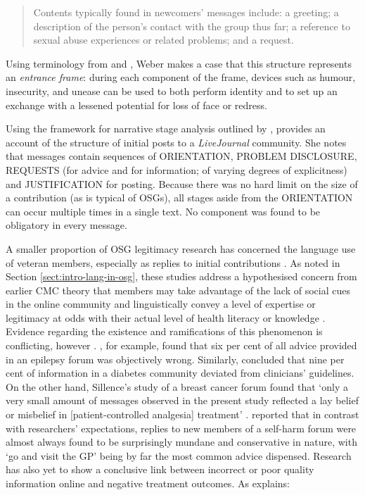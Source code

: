 \documentclass{article}
\renewcommand{\cite}{\parencite}
\begin{document}
\begin{quote}\small\singlespacing
Contents typically found in newcomers' messages include: a greeting; a description of the person's contact with the group thus far; a reference to sexual abuse experiences or related problems; and a request.
\end{quote}
%
Using terminology from \textcite{goffman_presentation_1959} and \textcite{brown_politeness:_1987}, Weber makes a case that this structure represents an \emph{entrance frame}: during each component of the frame, devices such as humour, insecurity, and unease can be used to both perform identity and to set up an exchange with a lessened potential for loss of face or redress. 

Using the framework for narrative stage analysis outlined by \textcite{labov_narrative_1997}, \textcite{kouper_pragmatics_2010} provides an account of the structure of initial posts to a \emph{LiveJournal} community. She notes that messages contain sequences of \textsc{ORIENTATION}, \textsc{PROBLEM DISCLOSURE}, \textsc{REQUESTS} (for advice and for information; of varying degrees of explicitness) and \textsc{JUSTIFICATION} for posting. Because there was no hard limit on the size of a contribution (as is typical of OSGs), all stages aside from the \textsc{ORIENTATION} can occur multiple times in a single text. No component was found to be obligatory in every message.


A smaller proportion of OSG legitimacy research has concerned the language use of veteran members, especially as replies to initial contributions \cite{paulus_`please_2015}. As noted in Section \ref{sect:intro-lang-in-osg}, these studies address a hypothesised concern from earlier CMC theory that members may take advantage of the lack of social cues in the online community and linguistically convey a level of expertise or legitimacy at odds with their actual level of health literacy or knowledge \cite{varga2014grieving}. Evidence regarding the existence and ramifications of this phenomenon is conflicting, however \cite{sillence_giving_2013}. \textcite{hoch_information_1999}, for example, found that six per cent of all advice provided in an epilepsy forum was objectively wrong. Similarly, \textcite{hoffman-goetz_clinical_2009} concluded that nine per cent of information in a diabetes community deviated from clinicians' guidelines. On the other hand, Sillence's study of a breast cancer forum found that `only a very small amount of messages observed in the present study reflected a lay belief or misbelief in [patient-controlled analgesia] treatment' \parencite*[p.~8]{sillence_communicating_2012}. \textcite{smithson_problem_2011} reported that in contrast with researchers' expectations, replies to new members of a self-harm forum were almost always found to be surprisingly mundane and conservative in nature, with `go and visit the GP' being by far the most common advice dispensed. Research has also yet to show a conclusive link between incorrect or poor quality information online and negative treatment outcomes. As \citeauthor{wang_stay_2012} explains:
\end{document}
